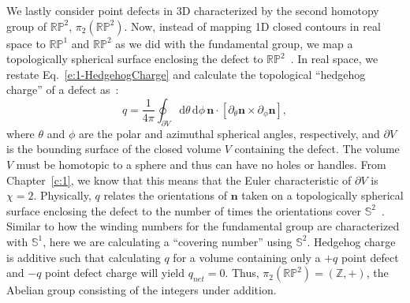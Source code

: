 We lastly consider point defects in 3D characterized by the second homotopy group of $\mathbb{R}\mathbb{P}^2$, $\pi_{2}(\mathbb{R}\mathbb{P}^2)$.
Now, instead of mapping 1D closed contours in real space to $\mathbb{R}\mathbb{P}^1$ and $\mathbb{R}\mathbb{P}^2$ as we did with the fundamental group, we map a topologically spherical surface enclosing the defect to $\mathbb{R}\mathbb{P}^2$~\cite{RN196,RN153,RN236}.
In real space, we restate Eq.~\ref{e:1-HedgehogCharge} and calculate the topological ``hedgehog charge'' of a defect as~\cite{RN153}:
\begin{equation}
  q = \frac{1}{4 \pi} \oint_{\partial V} \textrm{d} \theta \, \textrm{d} \phi \, \mathbf{n} \cdot \left [ \partial_{\theta} \mathbf{n} \times \partial_{\phi} \mathbf{n} \right ],\label{e:2-hedCharge}
\end{equation}
 where $\theta$ and $\phi$ are the polar and azimuthal spherical angles, respectively, and $\partial V$ is the bounding surface of the closed volume $V$ containing the defect.
The volume $V$ must be homotopic to a sphere and thus can have no holes or handles.
From Chapter~\ref{c:1}, we know that this means that the Euler characteristic of $\partial V$ is $\chi = 2$.
Physically, $q$ relates the orientations of $\mathbf{n}$ taken on a topologically spherical surface enclosing the defect to the number of times the orientations cover $\mathbb{S}^2$~\cite{RN153}.
Similar to how the winding numbers for the fundamental group are characterized with $\mathbb{S}^1$, here we are calculating a ``covering number'' using $\mathbb{S}^2$.
Hedgehog charge is additive such that calculating $q$ for a volume containing only a $+q$ point defect and $-q$ point defect charge will yield $q_{net} = 0$.
Thus, $\pi_{2}(\mathbb{R}\mathbb{P}^2) = (\mathbb{Z}, +)$, the Abelian group consisting of the integers under addition.

